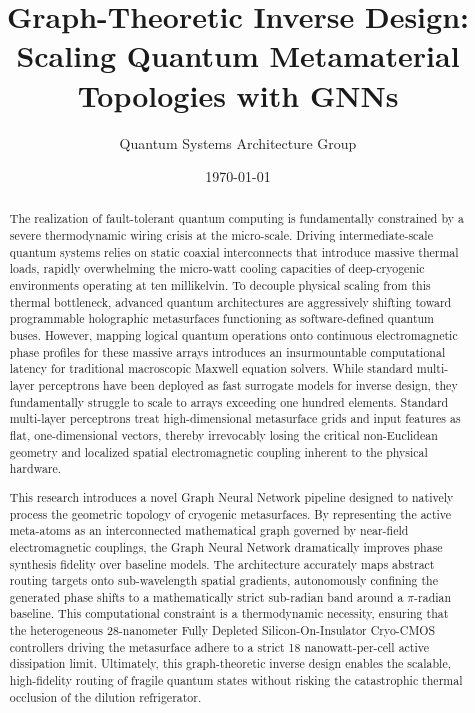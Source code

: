 \documentclass[11pt, a4paper]{article}
\title{\textbf{Graph-Theoretic Inverse Design: Scaling Quantum Metamaterial Topologies with GNNs}}
\author{Quantum Systems Architecture Group}
\date{\today}
\begin{document}
\maketitle

\begin{abstract}
The realization of fault-tolerant quantum computing is fundamentally constrained by a severe thermodynamic wiring crisis at the micro-scale. Driving intermediate-scale quantum systems relies on static coaxial interconnects that introduce massive thermal loads, rapidly overwhelming the micro-watt cooling capacities of deep-cryogenic environments operating at ten millikelvin. To decouple physical scaling from this thermal bottleneck, advanced quantum architectures are aggressively shifting toward programmable holographic metasurfaces functioning as software-defined quantum buses. However, mapping logical quantum operations onto continuous electromagnetic phase profiles for these massive arrays introduces an insurmountable computational latency for traditional macroscopic Maxwell equation solvers. While standard multi-layer perceptrons have been deployed as fast surrogate models for inverse design, they fundamentally struggle to scale to arrays exceeding one hundred elements. Standard multi-layer perceptrons treat high-dimensional metasurface grids and input features as flat, one-dimensional vectors, thereby irrevocably losing the critical non-Euclidean geometry and localized spatial electromagnetic coupling inherent to the physical hardware.

This research introduces a novel Graph Neural Network pipeline designed to natively process the geometric topology of cryogenic metasurfaces. By representing the active meta-atoms as an interconnected mathematical graph governed by near-field electromagnetic couplings, the Graph Neural Network dramatically improves phase synthesis fidelity over baseline models. The architecture accurately maps abstract routing targets onto sub-wavelength spatial gradients, autonomously confining the generated phase shifts to a mathematically strict sub-radian band around a $\pi$-radian baseline. This computational constraint is a thermodynamic necessity, ensuring that the heterogeneous 28-nanometer Fully Depleted Silicon-On-Insulator Cryo-CMOS controllers driving the metasurface adhere to a strict 18 nanowatt-per-cell active dissipation limit. Ultimately, this graph-theoretic inverse design enables the scalable, high-fidelity routing of fragile quantum states without risking the catastrophic thermal occlusion of the dilution refrigerator.
\end{abstract}
\end{document}
